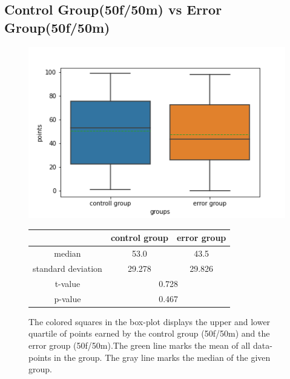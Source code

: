 \documentclass[runningheads]{llncs}
\begin{document}
\subsection{Control Group(50f/50m) vs Error Group(50f/50m)}
\begin{figure}[!h]
    \begin{minipage}{0.4\textwidth}        
        \includegraphics[width=\textwidth]{code/generate/all.png}
        \caption{The colored squares in the box-plot displays
        the upper and lower quartile of points earned by the control group (50f/50m) and
        the error group (50f/50m).The green line marks the mean of all data-points in the group.
        The gray line marks the median  of the given group.} \label{fig2}
    \end{minipage}
\hfill
\begin{minipage}{0.4\textwidth}
\begin{tabular}[]{| c | c | c |}
        \hline
        & control group & error group \\
        \hline
        median & 53.0&43.5 \\
        \hline
        standard deviation & 29.278&29.826 \\
        \hline
        t-value & \multicolumn{2}{c|}{0.728} \\
        \hline
        p-value & \multicolumn{2}{c|}{0.467} \\
        \hline            
\end{tabular}
\end{minipage}
\end{figure}
\end{document}
